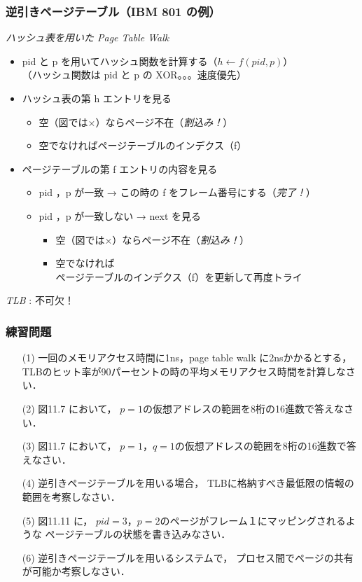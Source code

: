 \documentclass[unicode]{beamer}                   %
\begin{document}
\begin{frame}
  \frametitle{逆引きページテーブル（IBM 801 の例）}
  \emph{ハッシュ表を用いた Page Table Walk}
  \begin{itemize}
  \item pid と p を用いてハッシュ関数を計算する（$h \leftarrow f(pid, p)$）\\
    （ハッシュ関数は pid と p の XOR。。。速度優先）
    \vfill
  \item ハッシュ表の第 h エントリを見る
    \begin{itemize}
      \item 空（図では×）ならページ不在（\emph{割込み！}）
      \item 空でなければページテーブルのインデクス（f）
    \end{itemize}
    \vfill
  \item ページテーブルの第 f エントリの内容を見る
    \begin{itemize}
      \item pid ，p が一致 →  この時の f をフレーム番号にする（\emph{完了！}）
      \item pid ，p が一致しない →  next を見る
        \begin{itemize}
        \item 空（図では×）ならページ不在（\emph{割込み！}）
        \item 空でなければ\\ 
          ページテーブルのインデクス（f）を更新して再度トライ
        \end{itemize}
    \end{itemize}
  \end{itemize}

  \emph{TLB} : 不可欠！
\end{frame}

\begin{frame}
  \frametitle{練習問題}
  \begin{enumerate}
  \item[(1)] 一回のメモリアクセス時間に1ns，page table walk に2nsかかるとする，
    TLBのヒット率が90パーセントの時の平均メモリアクセス時間を計算しなさい．
  \item[(2)] 図11.7 において，
    $p=1$の仮想アドレスの範囲を8桁の16進数で答えなさい．
  \item[(3)] 図11.7 において，
    $p=1$，$q=1$の仮想アドレスの範囲を8桁の16進数で答えなさい．
  \item[(4)] 逆引きページテーブルを用いる場合，
    TLBに格納すべき最低限の情報の範囲を考察しなさい．
  \item[(5)] 図11.11 に，
    $pid=3$，$p=2$のページがフレーム１にマッピングされるような
    ページテーブルの状態を書き込みなさい．
  \item[(6)] 逆引きページテーブルを用いるシステムで，
    プロセス間でページの共有が可能か考察しなさい．
  \end{enumerate}
\end{frame}
\end{document}

